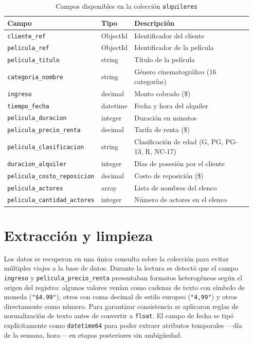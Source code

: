 \documentclass[12pt, a4paper]{report}
\newcommand{\variable}[1]{\texttt{\small #1}}
\begin{document}
\begin{table}[H]
\centering
\caption{Campos disponibles en la colección \texttt{alquileres}}
\label{tab:campos-mongo}
\begin{tabular}{@{} l l p{6cm} @{}}
\toprule
\textbf{Campo} & \textbf{Tipo} & \textbf{Descripción} \\
\midrule
\variable{cliente\_ref}               & ObjectId & Identificador del cliente \\
\variable{pelicula\_ref}              & ObjectId & Identificador de la película \\
\variable{pelicula\_titulo}           & string   & Título de la película \\
\variable{categoria\_nombre}          & string   & Género cinematográfico (16 categorías) \\
\variable{ingreso}                    & decimal  & Monto cobrado (\$) \\
\variable{tiempo\_fecha}              & datetime & Fecha y hora del alquiler \\
\variable{pelicula\_duracion}         & integer  & Duración en minutos \\
\variable{pelicula\_precio\_renta}    & decimal  & Tarifa de renta (\$) \\
\variable{pelicula\_clasificacion}    & string   & Clasificación de edad (G, PG, PG-13, R, NC-17) \\
\variable{duracion\_alquiler}         & integer  & Días de posesión por el cliente \\
\variable{pelicula\_costo\_reposicion}& decimal  & Costo de reposición (\$) \\
\variable{pelicula\_actores}          & array    & Lista de nombres del elenco \\
\variable{pelicula\_cantidad\_actores}& integer  & Número de actores en el elenco \\
\bottomrule
\end{tabular}
\end{table}

\section{Extracción y limpieza}

Los datos se recuperan en una única consulta sobre la colección para evitar múltiples viajes a la base de datos. Durante la lectura se detectó que el campo \variable{ingreso} y \variable{pelicula\_precio\_renta} presentaban formatos heterogéneos según el origen del registro: algunos valores venían como cadenas de texto con símbolo de moneda (\texttt{"\$4.99"}), otros con coma decimal de estilo europeo (\texttt{"4,99"}) y otros directamente como número. Para garantizar consistencia se aplicaron reglas de normalización de texto antes de convertir a \texttt{float}. El campo de fecha se tipó explícitamente como \texttt{datetime64} para poder extraer atributos temporales ---día de la semana, hora--- en etapas posteriores sin ambigüedad.
\end{document}
